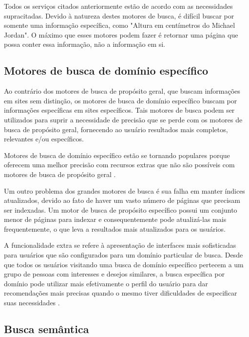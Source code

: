 Todos os serviços citados anteriormente estão de acordo com as necessidades supracitadas. Devido à natureza destes motores de busca, é difícil buscar por somente uma informação específica, como "Altura em centímetros do Michael Jordan". O máximo que esses motores podem fazer é retornar uma página que possa conter essa informação, não a informação em si.


\subsection{Motores de busca de domínio específico}

Ao contrário dos motores de busca de propósito geral, que buscam informações em sites sem distinção, os motores de busca de domínio específico buscam por informações específicas em sites específicos. Tais motores de busca podem ser utilizados para suprir a necessidade de precisão que se perde com os motores de busca de propósito geral, fornecendo ao usuário resultados mais completos, relevantes e/ou específicos.

Motores de busca de domínio específico estão se tornando populares porque oferecem uma melhor precisão com recursos extras que não são possíveis com motores de busca de propósito geral \cite[p. 8]{wober}.

Um outro problema dos grandes motores de busca é sua falha em manter índices atualizados, devido ao fato de haver um vasto número de páginas que precisam ser indexadas. Um motor de busca de propósito específico possui um conjunto menor de páginas para indexar e consequentemente pode atualizá-las mais frequentemente, o que leva a resultados mais atualizados para os usuários.

A funcionalidade extra se refere à apresentação de interfaces mais sofisticadas para usuários que são configurados para um domínio particular de busca. Desde que todos os usuários visitando uma busca de domínio específico pertecem a um grupo de pessoas com interesses e desejos similares, a busca específica por domínio pode utilizar mais efetivamente o perfil do usuário para dar recomendações mais precisas quando o mesmo tiver dificuldades de especificar suas necessidades \cite[p. 9]{wober}.

\subsection{Busca semântica}

